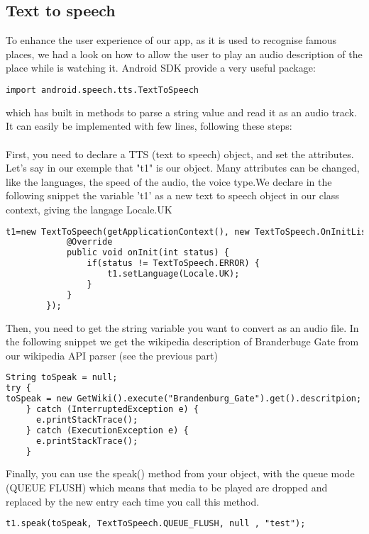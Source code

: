{\subsection{Text to speech}
To enhance the user experience of our app, as it is used to recognise famous places, we had a look on how to allow the user to play an audio description of the place while is watching it. Android SDK provide a very useful package:
\begin{lstlisting}[language=XML, basicstyle=\scriptsize]
import android.speech.tts.TextToSpeech
\end{lstlisting}
which has built in methods to parse a string value and read it as an audio track. It can easily be implemented with few lines, following these steps:\\\\
First, you need to declare a TTS (text to speech) object, and set the attributes. Let's say in our exemple that "t1" is our object. Many attributes can be changed, like the languages, the speed of the audio, the voice type.We declare in the following snippet the variable 't1' as a new text to speech object in our class context, giving the langage Locale.UK
\begin{lstlisting}[language=XML, basicstyle=\scriptsize]
t1=new TextToSpeech(getApplicationContext(), new TextToSpeech.OnInitListener() {
            @Override
            public void onInit(int status) {
                if(status != TextToSpeech.ERROR) {
                    t1.setLanguage(Locale.UK);
                }
            }
        });
\end{lstlisting}
Then, you need to get the string variable you want to convert as an audio file. In the following snippet we get the wikipedia description of Branderbuge Gate from our wikipedia API parser (see the previous part)
\begin{lstlisting}[language=XML, basicstyle=\scriptsize]
String toSpeak = null;
try {
toSpeak = new GetWiki().execute("Brandenburg_Gate").get().descritpion;
    } catch (InterruptedException e) {
      e.printStackTrace();
    } catch (ExecutionException e) {
      e.printStackTrace();
    }
\end{lstlisting}

Finally, you can use the speak() method from your object, with the queue mode (QUEUE FLUSH) which means that media to be played are dropped and replaced by the new entry each time you call this method.

\begin{lstlisting}[language=XML, basicstyle=\scriptsize]
t1.speak(toSpeak, TextToSpeech.QUEUE_FLUSH, null , "test");
\end{lstlisting}

}
